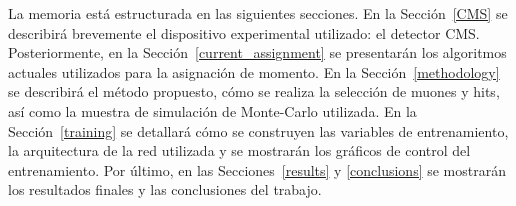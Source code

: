 La memoria est\'a estructurada en las siguientes secciones. En la Secci\'on~\ref{CMS} se describir\'a brevemente el dispositivo experimental utilizado: el detector CMS. Posteriormente, en la Secci\'on~\ref{current_assignment} se presentar\'an los algoritmos actuales utilizados para la asignaci\'on de momento. En la Secci\'on~\ref{methodology} se describir\'a el m\'etodo propuesto, c\'omo se realiza la selecci\'on de muones y hits, as\'i como la muestra de simulaci\'on de Monte-Carlo utilizada. En la Secci\'on~\ref{training} se detallar\'a c\'omo se construyen las variables de entrenamiento, la arquitectura de la red utilizada y se mostrar\'an los gr\'aficos de control del entrenamiento. Por \'ultimo, en las Secciones~\ref{results} y \ref{conclusions} se mostrar\'an los resultados finales y las conclusiones del trabajo.





